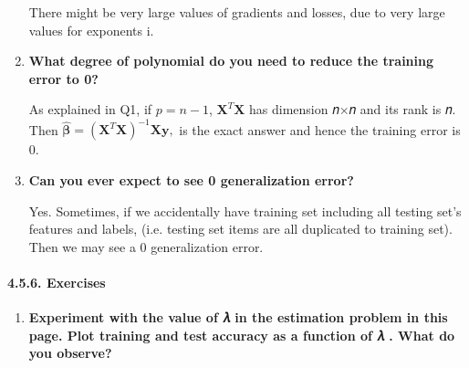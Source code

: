 \documentclass[11pt]{article}
\providecommand{\tightlist}{%
      \setlength{\itemsep}{0pt}\setlength{\parskip}{0pt}}
\begin{document}
\begin{enumerate}
  There might be very large values of gradients and losses, due to very
  large values for exponents i.
\item
  \textbf{What degree of polynomial do you need to reduce the training
  error to 0?}

  As explained in Q1, if \(p=n−1\), \(𝐗^T 𝐗\) has dimension 𝑛×𝑛 and its
  rank is 𝑛. Then
  \(\hat{\boldsymbol\beta}=(\mathbf{X}^T\mathbf{X})^{-1}\mathbf{X}\mathbf{y},\)
  is the exact answer and hence the training error is 0.
\item
  \textbf{Can you ever expect to see 0 generalization error?}

  Yes. Sometimes, if we accidentally have training set including all
  testing set's features and labels, (i.e. testing set items are all
  duplicated to training set). Then we may see a 0 generalization error.
\end{enumerate}

    \paragraph{4.5.6. Exercises}\label{exercises}

\begin{enumerate}
\def\labelenumi{\arabic{enumi}.}
\tightlist
\item
  \textbf{Experiment with the value of 𝜆 in the estimation problem in
  this page. Plot training and test accuracy as a function of 𝜆 . What
  do you observe?}
\end{enumerate}
\end{document}

